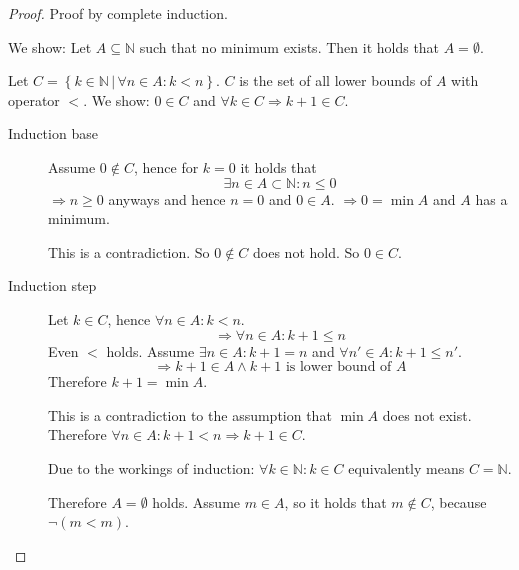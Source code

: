 \documentclass[a4paper,landscape,twocolumn]{article}
\theoremstyle{definition}
\newcommand\setdef[2]{\left\{#1\,|\,#2\right\}}
\begin{document}
\begin{proof}
  Proof by complete induction.

  We show: Let $A \subseteq \mathbb N$ such that no minimum exists.
  Then it holds that $A = \emptyset$.

  Let $C = \setdef{k \in \mathbb N}{\forall n \in A: k < n}$.
  $C$ is the set of all lower bounds of $A$ with operator $<$.
  We show: $0 \in C$ and $\forall k \in C \Rightarrow k + 1 \in C$.

  \begin{description}
    \item[Induction base]
      Assume $0 \not\in C$, hence for $k = 0$ it holds that
      \[ \exists n \in A \subset \mathbb N: n \leq 0 \]
      $\Rightarrow n \geq 0$ anyways and hence $n = 0$ and $0 \in A$.
      $\Rightarrow 0 = \min{A}$ and $A$ has a minimum.

      This is a contradiction. So $0 \not \in C$ does not hold.
      So $0 \in C$.
    \item[Induction step]
      Let $k \in C$, hence $\forall n \in A: k < n$.
      \[ \Rightarrow \forall n \in A: k + 1 \leq n \]
      Even $<$ holds. Assume $\exists n \in A: k + 1 = n$ and
      $\forall n' \in A: k + 1 \leq n'$.
      \[ \Rightarrow k + 1 \in A \land k + 1 \text{ is lower bound of } A \]
      Therefore $k + 1 = \min{A}$.

      This is a contradiction to the assumption that $\min{A}$ does not exist.
      Therefore $\forall n \in A: k + 1 < n \Rightarrow k + 1 \in C$.

      Due to the workings of induction: $\forall k \in \mathbb N: k \in C$
      equivalently means $C = \mathbb N$.

      Therefore $A = \emptyset$ holds.
      Assume $m \in A$, so it holds that $m \not\in C$, because $\neg (m < m)$.
  \end{description}
\end{proof}
\end{document}
